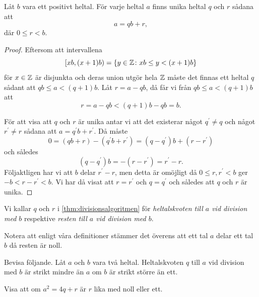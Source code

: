 \begin{theorem}[Divisionsalgoritmen]\label{thm:divisionsalgoritmen}
  Låt \(b\) vara ett positivt heltal.
  För varje heltal \(a\) finns unika heltal \(q\) och \(r\) sådana att \[a = qb 
  + r,\] där \(0\leq r < b\).
\end{theorem}
\begin{proof}
  Eftersom att intervallena \[ [xb, (x+1)b) = \{y\in\mathbb{Z} \colon xb\leq y < (x 
  + 1)b\} \] för \(x\in\mathbb{Z}\) är disjunkta och deras union utgör hela \(\mathbb{Z}\) 
  måste det finnas ett heltal \(q\) sådant att \(qb\leq a < (q+1)b\).
  Låt \(r = a - qb\), då får vi från \(qb\leq a < (q + 1)b\) att \[ r = a - qb 
  < (q + 1)b - qb = b.\]

  För att visa att \(q\) och \(r\) är unika antar vi att det existerar något 
  \(q^\prime\neq q\) och något \(r^\prime\neq r\) sådana att \(a = q^\prime 
  b + r^\prime\).
  Då måste \[0 = (qb + r) - (q^\prime b + r^\prime) = (q - q^\prime)b + (r 
  - r^\prime)\] och således \[ (q - q^\prime)b = -(r - r^\prime) = r^\prime 
  - r.\]
  Följaktligen har vi att \(b\) delar \(r^\prime - r\), men detta är omöjligt 
  då \(0\leq r, r^\prime < b\) ger \(-b < r - r^\prime < b\).
  Vi har då visat att \(r = r^\prime\) och \(q = q^\prime\) och således att 
  \(q\) och \(r\) är unika.
\end{proof}

\begin{definition}
  Vi kallar \(q\) och \(r\) i \cref{thm:divisionsalgoritmen} för
  \emph{heltalskvoten till \(a\) vid division med \(b\)} respektive
  \emph{resten till \(a\) vid division med \(b\)}.
\end{definition}

Notera att enligt våra definitioner stämmer det överens att ett tal \(a\) delar 
ett tal \(b\) då resten är noll.

\begin{exercise}\label{xrc:KvotenMindre}
  Bevisa följande.
  Låt \(a\) och \(b\) vara två heltal.
  Heltalskvoten \(q\) till \(a\) vid division med \(b\) är strikt mindre än 
  \(a\) om \(b\) är strikt större än ett.
\end{exercise}
\begin{exercise}
  Visa att om \(a^2 = 4q + r\) är \(r\) lika med noll eller ett.
\end{exercise}

